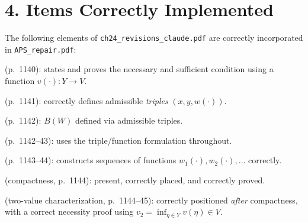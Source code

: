 \section{4. Items Correctly Implemented}

The following elements of {\tt ch24\_revisions\_claude.pdf} are correctly
incorporated in {\tt APS\_repair.pdf}:

 (p.~1140): states and proves the necessary and
sufficient condition using a function $v(\cdot):Y\to V$.

 (p.~1141): correctly defines admissible
{\it triples\/} $(x,y,w(\cdot))$.

 (p.~1142): $B(W)$ defined via admissible triples.

 (p.~1142--43): uses the triple/function
formulation throughout.

 (p.~1143--44): constructs sequences of
functions $w_1(\cdot),w_2(\cdot),\ldots$ correctly.

 (compactness, p.~1144): present, correctly
placed, and correctly proved.

 (two-value characterization, p.~1144--45):
correctly positioned {\it after\/} compactness, with a correct necessity
proof using $v_2=\inf_{\eta\in Y}v(\eta)\in V$.

\vfill\eject
\bye

